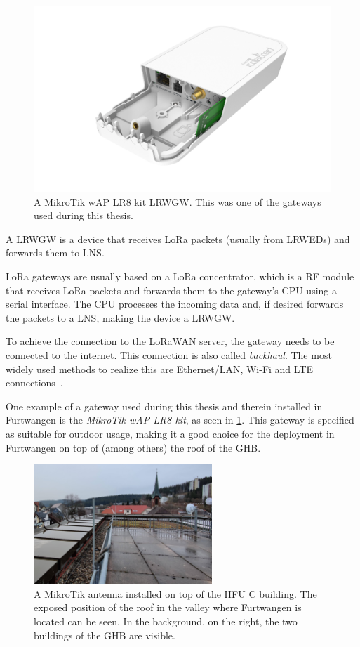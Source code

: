 \begin{figure}[htbp]
    \centering
    \includegraphics[width=.6\textwidth]{pictures/hardware/gateways/mikrotik-lr8-kit.png}
    \caption{
        A MikroTik wAP LR8 kit \acl{LRWGW}.
        This was one of the gateways used during this thesis.~\protect\cite{the_things_industries_bv_lorawan_nodate}
    }\label{pic:mikrotik-lr8-kit-gateway}
\end{figure}

A \acl{LRWGW} is a device that receives \ac{LoRa} packets (usually from \aclp{LRWED}) and forwards them to \ac{LNS}.

\ac{LoRa} gateways are usually based on a \ac{LoRa} concentrator, which is a \ac{RF} module that receives \ac{LoRa} packets and forwards them to the gateway's \ac{CPU} using a serial interface.
The \ac{CPU} processes the incoming data and, if desired forwards the packets to a \ac{LNS}, making the device a \acl{LRWGW}.

To achieve the connection to the \ac{LoRaWAN} server, the gateway needs to be connected to the internet.
This connection is also called \emph{backhaul}.
The most widely used methods to realize this are Ethernet/\ac{LAN}, Wi-Fi and \ac{LTE} connections~\cite{the_things_industries_bv_lorawan_nodate}.

One example of a gateway used during this thesis and therein installed in Furtwangen is the \emph{MikroTik wAP LR8 kit}, as seen in \cref{pic:mikrotik-lr8-kit-gateway}.
This gateway is specified as suitable for outdoor usage, making it a good choice for the deployment in Furtwangen on top of (among others) the roof of the \acf{GHB}.

\begin{figure}[htbp]
    \centering
    \includegraphics[width=0.6\textwidth]{pictures/hardware/gateway-deployment/mikrotik-antenna-c-building.jpg}
    \caption{
        A MikroTik antenna installed on top of the \ac{HFU} C building.
        The exposed position of the roof in the valley where Furtwangen is located can be seen.
        In the background, on the right, the two buildings of the \acf{GHB} are visible.
    }\label{pic:mikrotik-antenna-c-building}
\end{figure}

